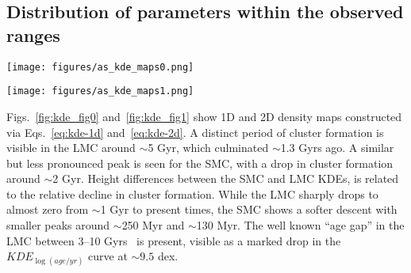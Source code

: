 \documentclass{aa}
\begin{document}

\subsection{Distribution of parameters within the observed ranges}
\label{ssec:dist_ranges}

\begin{figure*}
\texttt{[image: figures/as\_kde\_maps0.png]}
\caption{Adaptive Gaussian KDEs for age, metallicity, and mass. Top and right
plots are 1D KDEs, center plots are 2D KDEs. Observed clusters are plotted as
red and blue stars for the S/LMC, respectively. Sizes are scaled according to
each cluster's radius. A small scatter is introduced for clarity.}
\label{fig:kde_fig0}
\end{figure*}

\begin{figure*}
\texttt{[image: figures/as\_kde\_maps1.png]}
\caption{Same as Fig.~\ref{fig:kde_fig0} for $E_{(B-V)}$ and distance
modulus.}
\label{fig:kde_fig1}
\end{figure*}

Figs.~\ref{fig:kde_fig0} and~\ref{fig:kde_fig1} show 1D and 2D density maps
constructed via Eqs.~\ref{eq:kde-1d} and~\ref{eq:kde-2d}.
%
%
A distinct period of cluster formation is visible in the LMC around ${\sim}$5
Gyr, which culminated ${\sim}$1.3 Gyrs ago. A similar but less
pronounced peak is seen for the SMC, with a drop in cluster formation around
${\sim}$2 Gyr.
Height differences between the SMC and LMC KDEs, is related to the relative
decline in cluster formation. While the LMC sharply drops to almost zero from
${\sim}$1 Gyr to present times, the SMC shows a softer descent with smaller
peaks around ${\sim}$250 Myr and ${\sim}$130 Myr.
The well known ``age gap'' in the LMC between 3--10 Gyrs~\citep{Balbinot_2010}
is present, visible as a marked drop in the $KDE_{\log(age/yr)}$ curve at
$\sim9.5$ dex.
\end{document}
